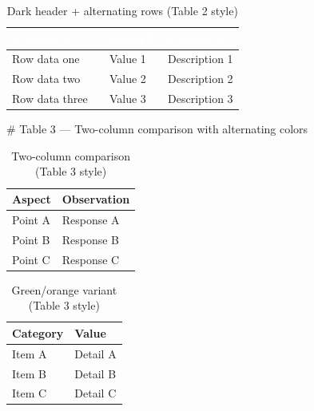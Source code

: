 \documentclass[12pt, a4paper]{article}
\newcommand{\snippetlabel}[1]{%
    \vspace{0.5em}%
    {\small\ttfamily\color{gray} \# #1}%
    \vspace{0.2em}%
}
\begin{document}
\begin{table}[H]
    \centering
    \renewcommand{\arraystretch}{1.5}
    \setlength{\tabcolsep}{12pt}
    \begin{tabular}{|p{5cm}|c|p{4cm}|}
        \hline
        \rowcolor{darkblue}
        \textcolor{white}{Column A} &
        \textcolor{white}{Column B} &
        \textcolor{white}{Column C} \\
        \hline
        Row data one    & Value 1 & Description 1 \\
        Row data two    & Value 2 & Description 2 \\
        Row data three  & Value 3 & Description 3 \\
        \hline
    \end{tabular}
    \caption{Dark header + alternating rows (Table 2 style)}
    \label{tab:style2}
\end{table}

\snippetlabel{Table 3 — Two-column comparison with alternating colors}

\begin{table}[H]
    \centering
    \renewcommand{\arraystretch}{1.3}
    \begin{tabular}{|p{6cm}|p{6cm}|}
        \hline
        \rowcolor{gray!30}
        \textbf{Aspect} & \textbf{Observation} \\
        \hline
        \rowcolor{blue!10}  Point A & \cellcolor{red!10} Response A \\
        \hline
        \rowcolor{blue!10}  Point B & \cellcolor{red!10} Response B \\
        \hline
        \rowcolor{blue!10}  Point C & \cellcolor{red!10} Response C \\
        \hline
    \end{tabular}
    \caption{Two-column comparison (Table 3 style)}
    \label{tab:style3}
\end{table}

\begin{table}[H]
    \centering
    \renewcommand{\arraystretch}{1.3}
    \begin{tabular}{|p{6cm}|p{6cm}|}
        \hline
        \rowcolor{gray!30}
        \textbf{Category} & \textbf{Value} \\
        \hline
        \rowcolor{green!10} Item A & \cellcolor{orange!20} Detail A \\
        \hline
        \rowcolor{green!10} Item B & \cellcolor{orange!20} Detail B \\
        \hline
        \rowcolor{green!10} Item C & \cellcolor{orange!20} Detail C \\
        \hline
    \end{tabular}
    \caption{Green/orange variant (Table 3 style)}
    \label{tab:style3b}
\end{table}
\end{document}
